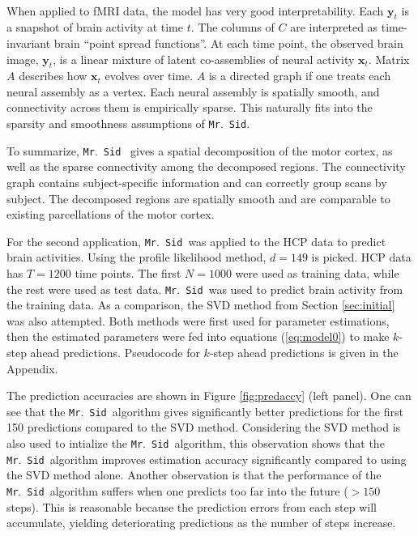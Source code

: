 \documentclass[fleqn,12pt]{article}
\let\oldref\ref
\renewcommand{\ref}[1]{(\oldref{#1})}
\newcommand{\mrsid}{{\sc \texttt{Mr}.~\texttt{Sid}}}
\providecommand{\mb}[1]{\boldsymbol{#1}}
\newcommand{\bx}{\mb{x}}
\newcommand{\by}{\mb{y}}
\begin{document}
\begin{center}
\[\begin{array}{lll}
\end{array}
\]
\label{fig:3d}
\end{center}

When applied to fMRI data, the model has very good interpretability. Each $\by_t$ is a snapshot of brain activity at time $t$. The columns of $C$ are interpreted as time-invariant brain ``point spread functions''. At each time point, the observed brain image, $\by_t$, is a linear mixture of latent co-assemblies of neural activity  $\bx_t$. Matrix $A$ describes how $\bx_t$ evolves over time. $A$ is a directed graph if one treats each neural assembly as a vertex. Each neural assembly is spatially smooth, and connectivity across them is empirically sparse. This naturally fits into the sparsity and smoothness assumptions of \mrsid.

To summarize, \mrsid~ gives a spatial decomposition of the motor cortex, as well as the sparse connectivity among the decomposed regions. The connectivity graph contains subject-specific information and can correctly group scans by subject. The decomposed regions are spatially smooth and are comparable to existing parcellations of the motor cortex.

For the second application, \mrsid~was applied to the HCP data to predict brain activities.
Using the profile likelihood method, $d=149$ is picked. HCP data has $T=1200$ time points. The first $N = 1000$ were used as training data, while the rest were used as test data.
\mrsid~was used to predict brain activity from the training data. As a comparison, the SVD method from Section \oldref{sec:initial} was also attempted. Both methods were first used for parameter estimations, then the estimated parameters were fed into equations \ref{eq:model0} to make $k$-step ahead predictions. Pseudocode for $k$-step ahead predictions is given in the Appendix.

The prediction accuracies are shown in Figure \oldref{fig:predaccy} (left panel). One can see that the \mrsid~algorithm gives significantly better predictions for the first 150 predictions compared to the SVD method. Considering the SVD method is also used to intialize the \mrsid~algorithm, this observation shows that the \mrsid~algorithm improves estimation accuracy significantly compared to using the SVD method alone. Another observation is that the performance of the \mrsid~algorithm suffers when one predicts too far into the future ($>150$ steps). This is reasonable because the prediction errors from each step will accumulate, yielding deteriorating predictions as the number of steps increase.
\end{document}
